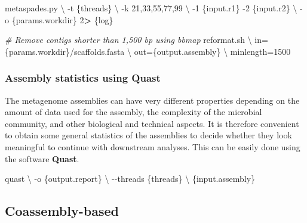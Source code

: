 \documentclass[
]{book}
\newenvironment{Shaded}{\begin{snugshade}}{\end{snugshade}}
\newcommand{\AttributeTok}[1]{\textcolor[rgb]{0.77,0.63,0.00}{#1}}
\newcommand{\CommentTok}[1]{\textcolor[rgb]{0.56,0.35,0.01}{\textit{#1}}}
\newcommand{\DataTypeTok}[1]{\textcolor[rgb]{0.13,0.29,0.53}{#1}}
\newcommand{\DecValTok}[1]{\textcolor[rgb]{0.00,0.00,0.81}{#1}}
\newcommand{\ExtensionTok}[1]{#1}
\newcommand{\NormalTok}[1]{#1}
\newcommand{\OperatorTok}[1]{\textcolor[rgb]{0.81,0.36,0.00}{\textbf{#1}}}
\begin{document}
\begin{Shaded}
\begin{Highlighting}[]
\ExtensionTok{metaspades.py} \DataTypeTok{\textbackslash{}}
    \AttributeTok{{-}t}\NormalTok{ \{threads\} }\DataTypeTok{\textbackslash{}}
    \AttributeTok{{-}k}\NormalTok{ 21,33,55,77,99 }\DataTypeTok{\textbackslash{}}
    \AttributeTok{{-}1}\NormalTok{ \{input.r1\} }\AttributeTok{{-}2}\NormalTok{ \{input.r2\} }\DataTypeTok{\textbackslash{}}
    \AttributeTok{{-}o}\NormalTok{ \{params.workdir\}}
    \DecValTok{2}\OperatorTok{\textgreater{}}\NormalTok{ \{log\}}

\CommentTok{\# Remove contigs shorter than 1,500 bp using bbmap}
\ExtensionTok{reformat.sh} \DataTypeTok{\textbackslash{}}
\NormalTok{    in=\{params.workdir\}/scaffolds.fasta }\DataTypeTok{\textbackslash{}}
\NormalTok{    out=\{output.assembly\} }\DataTypeTok{\textbackslash{}}
\NormalTok{    minlength=1500}
\end{Highlighting}
\end{Shaded}

\hypertarget{assembly-statistics-using-quast}{%
\subsubsection*{Assembly statistics using Quast}\label{assembly-statistics-using-quast}}

The metagenome assemblies can have very different properties depending on the amount of data used for the assembly, the complexity of the microbial community, and other biological and technical aspects. It is therefore convenient to obtain some general statistics of the assemblies to decide whether they look meaningful to continue with downstream analyses. This can be easily done using the software \textbf{Quast}.

\begin{Shaded}
\begin{Highlighting}[]
\ExtensionTok{quast} \DataTypeTok{\textbackslash{}}
    \AttributeTok{{-}o}\NormalTok{ \{output.report\} }\DataTypeTok{\textbackslash{}}
    \AttributeTok{{-}{-}threads}\NormalTok{ \{threads\} }\DataTypeTok{\textbackslash{}}
\NormalTok{    \{input.assembly\}}
\end{Highlighting}
\end{Shaded}

\hypertarget{coassembly-based}{%
\subsection*{Coassembly-based}\label{coassembly-based}}
\end{document}
